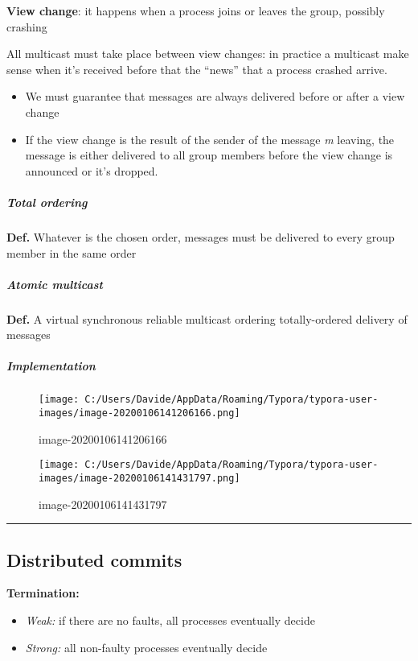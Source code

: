 \textbf{View change}: it happens when a process joins or leaves the
group, possibly crashing

All multicast must take place between view changes: in practice a
multicast make sense when it's received before that the ``news'' that a
process crashed arrive.

\begin{itemize}
\itemsep1pt\parskip0pt
\item
  We must guarantee that messages are always delivered before or after a
  view change
\item
  If the view change is the result of the sender of the message \emph{m}
  leaving, the message is either delivered to all group members before
  the view change is announced or it's dropped.
\end{itemize}

\subparagraph{Total ordering}\label{total-ordering}

\textbf{Def.} Whatever is the chosen order, messages must be delivered
to every group member in the same order

\subparagraph{Atomic multicast}\label{atomic-multicast}

\textbf{Def.} A virtual synchronous reliable multicast ordering
totally-ordered delivery of messages

\subparagraph{Implementation}\label{implementation}

\begin{figure}[htbp]
\centering
\texttt{[image: C:/Users/Davide/AppData/Roaming/Typora/typora-user-images/image-20200106141206166.png]}
\caption{image-20200106141206166}
\end{figure}

\begin{figure}[htbp]
\centering
\texttt{[image: C:/Users/Davide/AppData/Roaming/Typora/typora-user-images/image-20200106141431797.png]}
\caption{image-20200106141431797}
\end{figure}

\begin{center}\rule{3in}{0.4pt}\end{center}

\subsection{Distributed commits}\label{distributed-commits}

\textbf{Termination:}

\begin{itemize}
\itemsep1pt\parskip0pt
\item
  \emph{Weak:} if there are no faults, all processes eventually decide
\item
  \emph{Strong:} all non-faulty processes eventually decide
\end{itemize}


